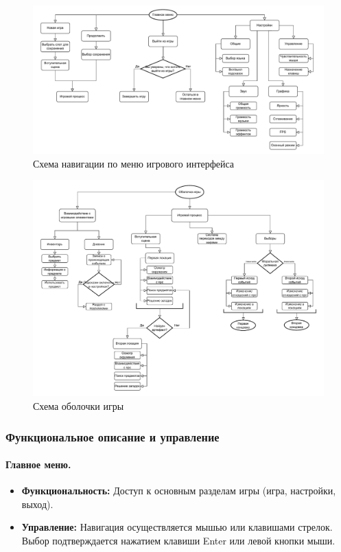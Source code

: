 \documentclass{article}
\begin{document}
	\newpage
	\begin{figure}[h!]
		\centering
		\includegraphics[width=\textwidth]{images/блоксхема1-2.pdf} 
		\caption{Схема навигации по меню игрового интерфейса}
		\label{fig:pdf-example}
	\end{figure}
	
	\begin{figure}[h!]
		\centering
		\includegraphics[width=\textwidth]{images/блоксхема2-3.pdf}
		\caption{Схема оболочки игры}
		\label{fig:pdf-example2}
	\end{figure}
	
	\newpage
	\subsubsection{Функциональное описание и управление}

	\paragraph{Главное меню.}
    \begin{itemize}
        \item \textbf{Функциональность:} Доступ к основным разделам игры (игра, настройки, выход).
        \item \textbf{Управление:} Навигация осуществляется мышью или клавишами стрелок. Выбор подтверждается нажатием клавиши Enter или левой кнопки мыши.
    \end{itemize}
    
\end{document}
